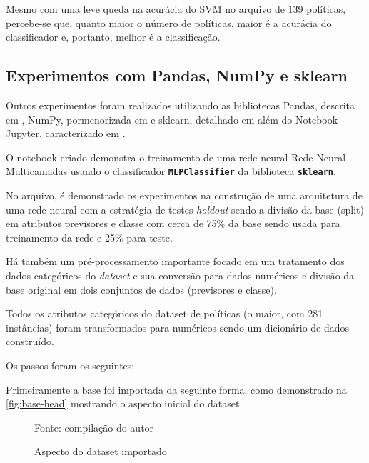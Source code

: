 Mesmo com uma leve queda na acurácia do SVM no arquivo de 139 políticas, percebe-se que, quanto maior o número de políticas, maior é a acurácia do classificador e, portanto, melhor é a classificação.

\subsection{Experimentos com Pandas, NumPy e sklearn}\label{exp:pandas-numpy-sklearn}
Outros experimentos foram realizados utilizando as bibliotecas Pandas, descrita em , NumPy, pormenorizada em  e sklearn, detalhado em  além do Notebook Jupyter, caracterizado em . 

O notebook criado demonstra o treinamento de uma rede neural Rede Neural Multicamadas usando o classificador \texttt{\textbf{MLPClassifier}} da biblioteca \texttt{\textbf{sklearn}}.

No arquivo, é demonstrado os experimentos na construção de uma arquitetura de uma rede neural com a estratégia de testes \textit{holdout} sendo a divisão da base (split) em atributos previsores e classe com cerca de 75\% da base sendo usada para treinamento da rede e 25\% para teste.

Há também um pré-processamento importante focado em um tratamento dos dados categóricos do \textit{dataset} e sua conversão para dados numéricos e divisão da base original em dois conjuntos de dados (previsores e classe).

Todos os atributos categóricos do dataset de políticas (o maior, com 281 instâncias) foram transformados para numéricos sendo um dicionário de dados construído.

Os passos foram os seguintes:

Primeiramente a base foi importada da seguinte forma, como demonstrado na \autoref{fig:base-head} mostrando o aspecto inicial do dataset.

\begin{figure}[h!]
	\centering
	\caption{Aspecto do dataset importado}
	
	\label{fig:base-head}
	{\scriptsize Fonte: compilação do autor}
\end{figure}

